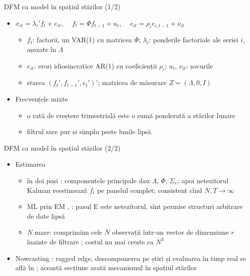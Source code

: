 \begin{frame}{DFM ca model în spațiul stărilor (1/2)}
\itemsize{\small}
\begin{itemize}
    \item $x_{it} = \lambda_i'f_t + e_{it}$, $\quad f_t = \Phi f_{t-1} + u_t$, $\quad e_{it} = \rho_ie_{i,t-1} + \nu_{it}$
    \begin{itemize}
        \item $f_t$: factorii, un VAR(1) cu matricea $\Phi$; $\lambda_i$: ponderile factoriale ale seriei $i$, așezate în $\Lambda$
        \item $e_{it}$: erori idiosincratice AR(1) cu coeficienții $\rho_i$; $u_t$, $\nu_{it}$: șocurile
        \item starea $(f_t', f_{t-1}', e_t')'$; matricea de măsurare $Z = (\Lambda, 0, I)$
    \end{itemize}
    \item Frecvențele mixte 
    \begin{itemize}
        \item o rată de creștere trimestrială este o sumă ponderată a stărilor lunare
        \item filtrul sare pur și simplu peste lunile lipsă
    \end{itemize}
\end{itemize}
\end{frame}

\begin{frame}{DFM ca model în spațiul stărilor (2/2)}
\itemsize{\small}
\begin{itemize}
    \item Estimarea
    \begin{itemize}
        \item în doi pași : componentele principale dau $\Lambda$, $\Phi$, $\Sigma_e$; apoi netezitorul Kalman reestimează $f_t$ pe panelul complet; consistent cînd $N, T \to \infty$
        \item ML prin EM , : pasul E este netezitorul, sînt permise structuri arbitrare de date lipsă
        \item $N$ mare: comprimăm cele $N$ observații într-un vector de dimensiune $r$ înainte de filtrare ; costul nu mai crește ca $N^3$
    \end{itemize}
    \item Nowcasting : ragged edge, descompunerea pe știri și evaluarea în timp real se află în ; această secțiune arată mecanismul în spațiul stărilor
\end{itemize}
\end{frame}

